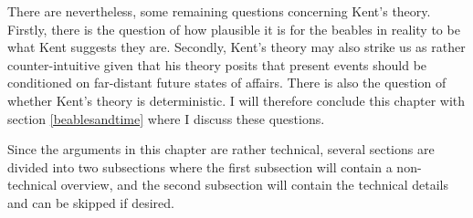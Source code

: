 There are nevertheless, some remaining questions concerning Kent's theory. Firstly, there is the question of how plausible it is for the  beables in reality to be what Kent suggests they are. Secondly, Kent's theory may also strike us as rather counter-intuitive given that his theory posits that present events should be conditioned on far-distant future states of affairs. There is also the question of whether Kent's theory is deterministic. I will therefore conclude this chapter with section \ref{beablesandtime} where I discuss these questions.

Since the arguments in this chapter are rather technical, several sections are divided into two subsections where the first subsection will contain a non-technical overview, and the second subsection will contain the technical details and can be skipped if desired.  